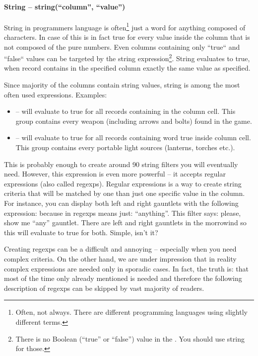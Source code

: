 \paragraph{String -- string(``column'', ``value'')}
String in programmers language is often\footnote{Often, not always. There are different programming languages using slightly different terms.}
just a word for anything composed of characters. In case of \OCS{} this is in fact true for every value inside the column that is not composed
of the pure numbers. Even columns containing only ``true`` and ``false`` values can be targeted by the string expression\footnote{There is no
Boolean (``true'' or ``false'') value in the \OCS. You should use string for those.}. String evaluates to true, 
when record contains in the specified column exactly the same value as specified.

Since majority of the columns contain string values, string is among the most often used expressions. Examples:
\begin{itemize}
 \item {} -- will evaluate to true for all records containing  in the  column cell.
 This group contains every weapon (including arrows and bolts) found in the game.
 \item {} -- will evaluate to true for all records containing word true inside  column cell.
 This group contains every portable light sources (lanterns, torches etc.).
\end{itemize}
This is probably enough to create around 90 string filters you will eventually need. However, this expression is even more powerful
-- it accepts regular expressions (also called regexps). Regular expressions is a way to create string criteria that will be matched 
by one than just one specific value in the column. For instance, you can display both left and right gauntlets with the following expression:
 because  in regexps means just: ``anything''. This filter says: please, show me ``any'' gauntlet.
There are left and right gauntlets in the morrowind so this will evaluate to true for both. Simple, isn't it?

Creating regexps can be a difficult and annoying -- especially when you need complex criteria. On the other hand, we are under impression
that in reality complex expressions are needed only in sporadic cases. In fact, the truth is: that most of the time only already mentioned
 is needed and therefore the following description of regexps can be skipped by vast majority of readers.

